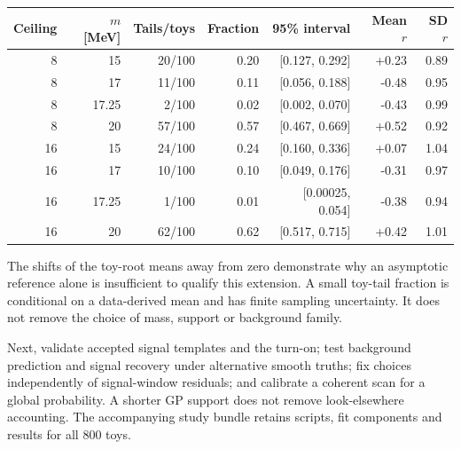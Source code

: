 \begin{center}\small
\begin{tabular}{rrrrrrr}\toprule
Ceiling & $m$ [MeV] & Tails/toys & Fraction & 95\% interval & Mean $r$ & SD $r$\\\midrule
8 & 15 & 20/100 & 0.20 & [0.127, 0.292] & +0.23 & 0.89 \\
8 & 17 & 11/100 & 0.11 & [0.056, 0.188] & -0.48 & 0.95 \\
8 & 17.25 & 2/100 & 0.02 & [0.002, 0.070] & -0.43 & 0.99 \\
8 & 20 & 57/100 & 0.57 & [0.467, 0.669] & +0.52 & 0.92 \\
16 & 15 & 24/100 & 0.24 & [0.160, 0.336] & +0.07 & 1.04 \\
16 & 17 & 10/100 & 0.10 & [0.049, 0.176] & -0.31 & 0.97 \\
16 & 17.25 & 1/100 & 0.01 & [0.00025, 0.054] & -0.38 & 0.94 \\
16 & 20 & 62/100 & 0.62 & [0.517, 0.715] & +0.42 & 1.01 \\
\bottomrule\end{tabular}\end{center}

The shifts of the toy-root means away from zero demonstrate why an asymptotic reference alone is insufficient to qualify this extension. A small toy-tail fraction is conditional on a data-derived mean and has finite sampling uncertainty. It does not remove the choice of mass, support or background family.

Next, validate accepted signal templates and the turn-on; test background prediction and signal recovery under alternative smooth truths; fix choices independently of signal-window residuals; and calibrate a coherent scan for a global probability. A shorter GP support does not remove look-elsewhere accounting. The accompanying study bundle retains scripts, fit components and results for all 800 toys.
